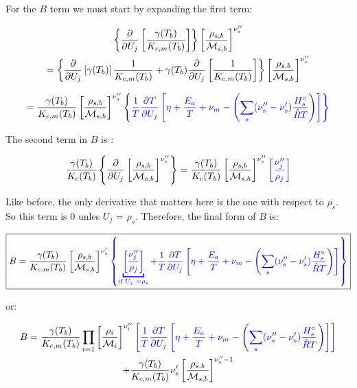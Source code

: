 \documentclass[10pt]{article}
\begin{document}
\begin{flushleft}
For the $B$ term we must start by expanding the first term:

\begin{multline}
    \left\{ \frac{\partial }{\partial U_j} \left[ \frac{\gamma(T_b)}{K_{c,m}(T_b)} \right] \right\} \left[ \frac{\rho_{s,b}}{\mathcal{M}_{s,b}} \right]^{\nu_s''} 
    \\ = \left\{ \frac{\partial }{\partial U_j} \left[ \gamma(T_b) \right] \frac{1}{K_{c,m}(T_b)} + \gamma(T_b) \frac{\partial }{\partial U_j} \left[ \frac{1}{K_{c,m}(T_b)} \right] \right\} \left[ \frac{\rho_{s,b}}{\mathcal{M}_{s,b}} \right]^{\nu_s''}
\end{multline}

\begin{multline}
    = \frac{\gamma(T_b)}{K_{c,m}(T_b)} \left[ \frac{\rho_{s,b}}{\mathcal{M}_{s,b}} \right]^{\nu_s''}   \textcolor{blue}{ \left\{  \frac{1}{T} \frac{\partial T}{\partial U_j} \left[  \eta + \frac{E_a}{T} + \nu_m - \left( \sum_s(\nu_s'' - \nu_s') \frac{H_s^\circ}{\hat{R}T}  \right) \right] \right\}}
\end{multline}


The second term in $B$ is :

\begin{equation}
     \frac{\gamma(T_b)}{K_c(T_b)} \left\{ \frac{\partial }{\partial U_j} \left[ \frac{\rho_{s,b}}{\mathcal{M}_{s,b}} \right]^{\nu_s''} \right\} = \frac{\gamma(T_b)}{K_c(T_b)} \left[ \frac{\rho_{s,b}}{\mathcal{M}_{s,b}} \right]^{\nu_s''} \textcolor{blue}{\left[ \frac{\nu_j''}{\rho_j} \right]}
\end{equation}

Like before, the only derivative that matters here is the one with respect to $\rho_s$. So this term is 0 unles $U_j$ = $\rho_s$. Therefore, the final form of $B$ is:

\begin{multline}
    \boxed{B = \frac{\gamma(T_b)}{K_{c,m}(T_b)} \bb{\frac{\rho_{s,b}}{\mathcal{M}_{s,b}}}^{\nu_s'}   \textcolor{blue}{ \bcb{\underbracket{\bb{\frac{\nu_j''}{\rho_j}}}_{\text{if $U_j$ =$\rho_s$}} + \frac{1}{T} \pd{T}{U_j} \bb{ \eta + \frac{E_a}{T} + \nu_m - \bp{\sum_s(\nu_s'' - \nu_s') \frac{H_s^\circ}{\hat{R}T} }}}} }
\end{multline}

or:

\begin{multline}
    B = \frac{\gamma(T_b)}{K_{c,m}(T_b)} \prod_{i=1} \left[ \frac{\rho_i}{\mathcal{M}_i} \right]^{\nu_i''} \textcolor{blue} {\left[ \frac{1}{T} \frac{\partial T}{\partial U_j} \left[  \eta + \frac{E_a}{T} + \nu_m - \left( \sum_s(\nu_s'' - \nu_s') \frac{H_s^\circ}{\hat{R}T} \right) \right] \right]}
    \\ + \frac{\gamma(T_b)}{K_{c,m}(T_b)} \nu_s' \left[ \frac{\rho_{s,b}}{\mathcal{M}_{s,b}} \right]^{\nu_s'' - 1}
\end{multline}



\end{flushleft}
\end{document}
